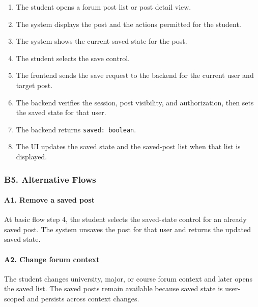 \documentclass[12pt]{article}
\begin{document}
\begin{enumerate}
\item The student opens a forum post list or post detail view.
\item The system displays the post and the actions permitted for the student.
\item The system shows the current saved state for the post.
\item The student selects the save control.
\item The frontend sends the save request to the backend for the current user and target post.
\item The backend verifies the session, post visibility, and authorization, then sets the saved state for that user.
\item The backend returns \texttt{saved: boolean}.
\item The UI updates the saved state and the saved-post list when that list is displayed.
\end{enumerate}
\par\medskip

\hypertarget{sec:b5-alternative-flows}{}
\subsubsection*{B5. Alternative Flows}
\par\medskip

\hypertarget{sec:a1-remove-a-saved-post}{}
\paragraph*{A1. Remove a saved post}
\par\medskip

At basic flow step 4, the student selects the saved-state control for an already saved post. The system unsaves the post for that user and returns the updated saved state.
\par\medskip

\hypertarget{sec:a2-change-forum-context}{}
\paragraph*{A2. Change forum context}
\par\medskip

The student changes university, major, or course forum context and later opens the saved list. The saved posts remain available because saved state is user-scoped and persists across context changes.
\par\medskip
\end{document}
